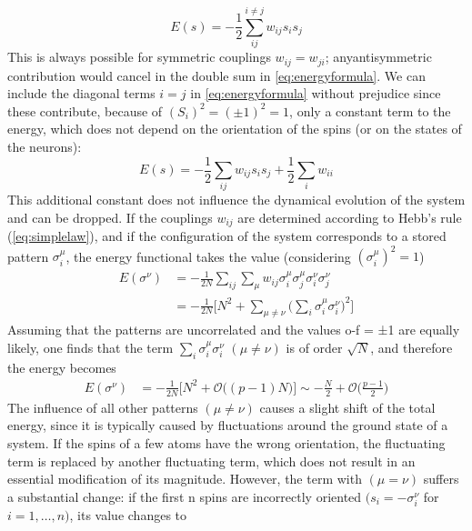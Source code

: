 \begin{equation}
    E(s)=-\frac{1}{2}\sum_{ij}^{i \neq j}w_{ij}s_{i}s_{j}
    \label{eq:energyformula}
\end{equation}
This is always possible for symmetric couplings $w_{ij} = w_{ji}$; anyantisymmetric contribution would cancel in the double sum in \ref{eq:energyformula}.
We can include the diagonal terms $i = j$ in \ref{eq:energyformula} without prejudice since these contribute, because of $(S_i)^2 = (\pm1)^2 = 1$, only a constant term to the energy, which does
not depend on the orientation of the spins (or on the states of the neurons):
\begin{equation}
    E(s)=-\frac{1}{2}\sum_{ij}w_{ij}s_{i}s_{j}+\frac{1}{2}\sum_{i}w_{ii}
    \label{eq:additionalconstants}
\end{equation}
This additional constant does not influence the dynamical evolution of the system and can be dropped.
If the couplings $w_{ij}$ are determined according to Hebb's rule (\ref{eq:simplelaw}), and if the configuration of the system corresponds to a stored pattern $\sigma_{i}^{\mu}$, the energy functional takes the value (considering $(\sigma_{i}^{\mu})^{2}=1$)
\begin{equation}
    \begin{split}
        E(\sigma^{\nu})&=-\frac{1}{2N}\sum_{ij}\sum_{\mu}w_{ij}\sigma^{\mu}_{i}\sigma^{\mu}_{j}\sigma^{\nu}_{i}\sigma^{\nu}_{j}\\
        &=-\frac{1}{2N}\Big[N^2 +\sum_{\mu\neq \nu}\Big(\sum_{i}\sigma^{\mu}_{i}\sigma^{\nu}_{i}\Big)^2\Big]
    \end{split}
\label{eq:en1}
\end{equation}
Assuming that the patterns are uncorrelated and the values o-f = ±1 are
equally likely, one finds that the term $\sum_{i}\sigma^{\mu}_{i}\sigma^{\nu}_{i}$ $(\mu \neq \nu)$ is of order $\sqrt{N}$, and therefore the energy becomes
\begin{equation}
    \begin{split}
        E(\sigma^{\nu})&=-\frac{1}{2N}\Big[N^2 + \mathcal{O}\big((p-1)N\big)\Big]\sim -\frac{N}{2}+\mathcal{O}\Big(\frac{p-1}{2}\Big)
    \end{split}
\label{eq:en2}
\end{equation}
The influence of all other patterns $(\mu \neq \nu)$ causes a slight shift of the total energy, since it is typically caused by fluctuations around the ground state of a system. If the spins of a few atoms have the wrong orientation, the fluctuating term is replaced by another fluctuating term, which does not result in an essential modification of its magnitude. However, the term with $(\mu = \nu)$ suffers a substantial change: if the first n spins are incorrectly oriented $(s_{i} = -\sigma^{\nu}_{i}$ for $i = 1, \dots , n)$, its value changes to


